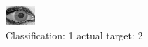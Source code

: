 \begin{figure}[h!]
\begin{center}
\includegraphics[width=0.60\columnwidth]{figures/ID2043_class_1_target_2.png}
\end{center}
\caption{ Classification: 1 actual target: 2}
\label{fig:ID2043_class_1_target_2}
\end{figure}
